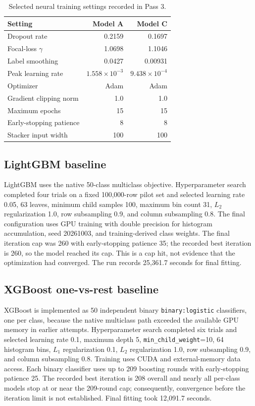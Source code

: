 \documentclass[conference]{IEEEtran}
\begin{document}
\begin{table}[t]
\centering
\caption{Selected neural training settings recorded in Pass 3.}
\label{tab:neural_training}
\small
\begin{tabular}{lrr}
\toprule
Setting & Model A & Model C \\
\midrule
Dropout rate & 0.2159 & 0.1697 \\
Focal-loss $\gamma$ & 1.0698 & 1.1046 \\
Label smoothing & 0.0427 & 0.00931 \\
Peak learning rate & $1.558\times10^{-3}$ & $9.438\times10^{-4}$ \\
Optimizer & Adam & Adam \\
Gradient clipping norm & 1.0 & 1.0 \\
Maximum epochs & 15 & 15 \\
Early-stopping patience & 8 & 8 \\
Stacker input width & 100 & 100 \\
\bottomrule
\end{tabular}
\end{table}

\subsection{LightGBM baseline}

LightGBM uses the native 50-class multiclass objective. Hyperparameter search completed four trials on a fixed 100,000-row pilot set and selected learning rate 0.05, 63 leaves, minimum child samples 100, maximum bin count 31, $L_2$ regularization 1.0, row subsampling 0.9, and column subsampling 0.8. The final configuration uses GPU training with double precision for histogram accumulation, seed 20261003, and training-derived class weights. The final iteration cap was 260 with early-stopping patience 35; the recorded best iteration is 260, so the model reached its cap. This is a cap hit, not evidence that the optimization had converged. The run records 25,361.7 seconds for final fitting.

\subsection{XGBoost one-vs-rest baseline}
\label{sec:models}

XGBoost is implemented as 50 independent binary \texttt{binary:logistic} classifiers, one per class, because the native multiclass path exceeded the available GPU memory in earlier attempts. Hyperparameter search completed six trials and selected learning rate 0.1, maximum depth 5, \texttt{min\_child\_weight}=10, 64 histogram bins, $L_1$ regularization 0.1, $L_2$ regularization 1.0, row subsampling 0.9, and column subsampling 0.8. Training uses CUDA and external-memory data access. Each binary classifier uses up to 209 boosting rounds with early-stopping patience 25. The recorded best iteration is 208 overall and nearly all per-class models stop at or near the 209-round cap; consequently, convergence before the iteration limit is not established. Final fitting took 12,091.7 seconds.
\end{document}

